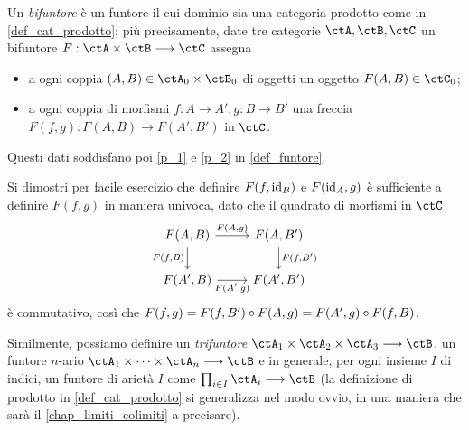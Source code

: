 \begin{definition}[Bifuntore]\label{def_bifuntore}
	Un \emph{bifuntore} è un funtore il cui dominio sia una categoria prodotto come in \ref{def_cat_prodotto}; più precisamente, date tre categorie \(\ctA,\ctB,\ctC\) un bifuntore \(F : \ctA \times \ctB \fun \ctC\) assegna
	\begin{itemize}
		\item a ogni coppia \((A,B)\in \ctA_0\times\ctB_0\) di oggetti un oggetto \(F(A,B) \in\ctC_0\);
		\item a ogni coppia di morfismi \(f : A\to A', g : B\to B'\) una freccia \(F(f,g) : F(A,B)\to F(A',B')\) in \(\ctC\).
	\end{itemize}
	Questi dati soddisfano poi \ref{p_1} e \ref{p_2} in \ref{def_funtore}.
\end{definition}
Si dimostri per facile esercizio che definire \(F(f,\mathrm{id}_B)\) e \(F(\mathrm{id}_A,g)\) è sufficiente a definire \(F(f,g)\) in maniera univoca, dato che il quadrato di morfismi in \(\ctC\)
\[
	\begin{tikzcd}
		F(A,B) \ar[r, "{F(A,g)}"]\ar[d, "{F(f,B)}"'] & F(A,B') \ar[d, "{F(f,B')}"]\\
		F(A',B) \ar[r, "{F(A',g)}"'] & F(A',B')
	\end{tikzcd}
\]
è commutativo, così che \(F(f,g)=F(f,B')\circ F(A,g) = F(A',g)\circ F(f,B)\).
\begin{notation}
	Similmente, possiamo definire un \emph{trifuntore} \(\ctA_1\times\ctA_2\times\ctA_3\fun\ctB\), un funtore \(n\)-ario \(\ctA_1\times\dots\times\ctA_n\fun\ctB\) e in generale, per ogni insieme \(I\) di indici, un funtore di arietà \(I\) come \(\prod_{i\in I}\ctA_i\fun\ctB\) (la definizione di prodotto in \ref{def_cat_prodotto} si generalizza nel modo ovvio, in una maniera che sarà il \autoref{chap_limiti_colimiti} a precisare).
\end{notation}
